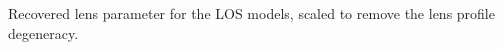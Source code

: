 \label{fig:scaled_triangle} Recovered lens parameter for the LOS models, scaled to remove the lens profile degeneracy.